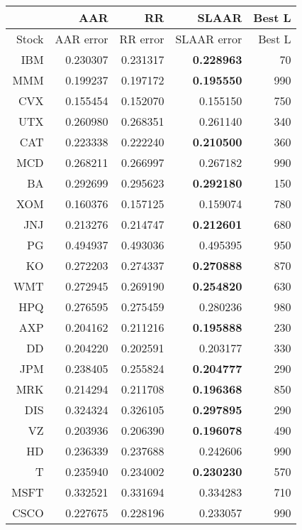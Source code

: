 \begin{table}[h!]
    \centering
    \footnotesize
    \begin{tabular}{*{5}{r}}
        \toprule
          & AAR & RR & SLAAR& Best L \\
         \midrule
Stock  &  AAR error  &   RR error  &   SLAAR error  &   Best L  \\
IBM  &  0.230307  &  0.231317  &  \textbf{0.228963}  &  70   \\
MMM  &  0.199237  &  0.197172  &  \textbf{ 0.195550} &  990\\
CVX  &  0.155454  &  0.152070  &  0.155150  &  750\\
UTX  &  0.260980  &  0.268351  &  0.261140  &  340\\
CAT  &  0.223338  &  0.222240  &  \textbf{ 0.210500} &  360\\
MCD  &  0.268211  &  0.266997  &  0.267182  &  990\\
BA  &  0.292699  &  0.295623  &  \textbf{ 0.292180} &  150\\
XOM  &  0.160376  &  0.157125  &  0.159074  &  780\\
JNJ  &  0.213276  &  0.214747  &  \textbf{ 0.212601}  &  680\\
PG  &  0.494937  &  0.493036  &  0.495395  &  950\\
KO  &  0.272203  &  0.274337  &  \textbf{ 0.270888} &  870\\
WMT  &  0.272945  &  0.269190  &  \textbf{ 0.254820}  &  630\\
HPQ  &  0.276595  &  0.275459  &  0.280236  &  980\\
AXP  &  0.204162  &  0.211216  &  \textbf{ 0.195888}  &  230\\
DD  &  0.204220  &  0.202591  &  0.203177  &  330\\
JPM  &  0.238405  &  0.255824  &  \textbf{ 0.204777}  &  290\\
MRK  &  0.214294  &  0.211708  &  \textbf{ 0.196368}  &  850\\
DIS  &  0.324324  &  0.326105  &  \textbf{ 0.297895}  &  290\\
VZ  &  0.203936  &  0.206390  &  \textbf{ 0.196078}  &  490\\
HD  &  0.236339  &  0.237688  &  0.242606  &  990\\
T  &  0.235940  &  0.234002  &  \textbf{ 0.230230}  &  570\\
MSFT  &  0.332521  &  0.331694  &  0.334283  &  710\\
CSCO  &  0.227675  &  0.228196  &  0.233057  &  990\\

\end{tabular}
\end{table}
